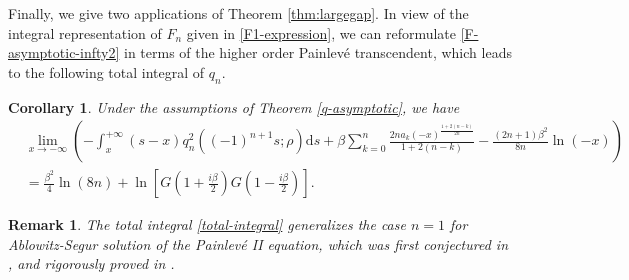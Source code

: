 \documentclass[11pt,a4paper]{article}
\newtheorem{corollary}[thm]{Corollary}
\newtheorem{rem}[thm]{Remark}
\numberwithin{equation}{section}
\begin{document}
Finally, we give two applications of Theorem \ref{thm:largegap}. In view of the integral representation of $F_n$ given in  \eqref{F1-expression}, we can reformulate \eqref{F-asymptotic-infty2} in terms of the higher order Painlev\'e transcendent, which leads to the following total integral of $q_{n}$.
\begin{corollary}
Under the assumptions of Theorem \ref{q-asymptotic}, we have
\begin{align}\label{total-integral}
&\lim_{x\to-\infty}\left(-\int_x^{+\infty}(s-x)
q_{n}^2\left((-1)^{n+1}s;\rho\right)\mathrm{d}s
+\beta\sum_{k=0}^{n}\frac{2na_k(-x)^{\frac{1+2(n-k)}{2n}}}{1+2(n-k)}
-\frac{(2n+1)\beta^2}{8n}\ln(-x)\right)\nonumber\\
&=\frac{\beta^2}{4}\ln(8n)
+\ln\left[G\left(1+\frac{i\beta}{2}\right)G\left(1-\frac{i\beta}{2}\right)\right].
\end{align}
\end{corollary}

\begin{rem}
The total integral \eqref{total-integral} generalizes the case $n=1$ for Ablowitz-Segur solution of the Painlev\'e II equation, which was first conjectured in
\cite[Conjecture 3]{BCI2016}, and rigorously proved in \cite[Corollary 1.7]{BB2018}.
\end{rem}
\end{document}
